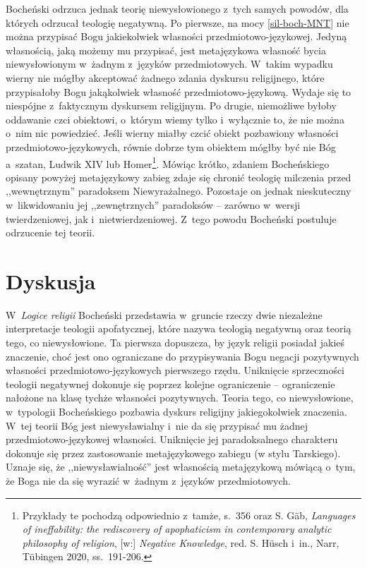 Bocheński odrzuca jednak teorię niewysłowionego z~tych samych powodów, dla których odrzucał teologię negatywną. Po pierwsze, na mocy \ref{sil-boch-MNT} nie można przypisać Bogu jakiekolwiek własności przedmiotowo-językowej. Jedyną własnością, jaką możemy mu przypisać, jest metajęzykowa własność bycia niewysłowionym w~żadnym z~języków przedmiotowych. W~takim wypadku wierny nie mógłby akceptować żadnego zdania dyskursu religijnego, które przypisałoby Bogu jakąkolwiek własność przedmiotowo-językową. Wydaje się to niespójne z~faktycznym dyskursem religijnym. Po drugie, niemożliwe byłoby oddawanie czci obiektowi, o~którym wiemy tylko i~wyłącznie to, że nie można o~nim nic powiedzieć. Jeśli wierny miałby czcić obiekt pozbawiony własności przedmiotowo-językowych, równie dobrze tym obiektem mógłby być nie Bóg a~szatan, Ludwik XIV lub Homer\footnote{Przykłady te pochodzą odpowiednio z~tamże, s.~356 oraz S. Gäb, \textit{Languages of ineffability: the rediscovery of apophaticism in contemporary analytic philosophy of religion}, [w:] \textit{Negative Knowledge}, red. S. Hüsch i~in., Narr, Tübingen 2020, ss.~191-206.}. Mówiąc krótko, zdaniem Bocheńskiego opisany powyżej metajęzykowy zabieg zdaje się chronić teologię milczenia przed ,,wewnętrznym'' paradoksem Niewyrażalnego. Pozostaje on jednak nieskuteczny w~likwidowaniu jej ,,zewnętrznych'' paradoksów -- zarówno w~wersji twierdzeniowej, jak i~nietwierdzeniowej. Z~tego powodu Bocheński postuluje odrzucenie tej teorii.


\section{Dyskusja}\label{sil-boch-dyskusja}

W~\textit{Logice religii} Bocheński przedstawia w~gruncie rzeczy dwie niezależne interpretacje teologii apofatycznej, które nazywa teologią negatywną oraz teorią tego, co niewysłowione. Ta pierwsza dopuszcza, by język religii posiadał jakieś znaczenie, choć jest ono ograniczane do przypisywania Bogu negacji pozytywnych własności przedmiotowo-językowych pierwszego rzędu. Uniknięcie sprzeczności teologii negatywnej dokonuje się poprzez kolejne ograniczenie -- ograniczenie nałożone na klasę tychże
własności pozytywnych. Teoria tego, co niewysłowione, w~typologii Bocheńskiego pozbawia dyskurs religijny jakiegokolwiek znaczenia. W~tej teorii Bóg jest niewysławialny i~nie da się przypisać mu żadnej przedmiotowo-językowej własności. Uniknięcie jej paradoksalnego charakteru dokonuje się przez zastosowanie metajęzykowego zabiegu (w stylu Tarskiego). Uznaje się, że ,,niewysławialność'' jest własnością metajęzykową mówiącą o~tym, że Boga nie da się wyrazić w~żadnym z~języków przedmiotowych.

